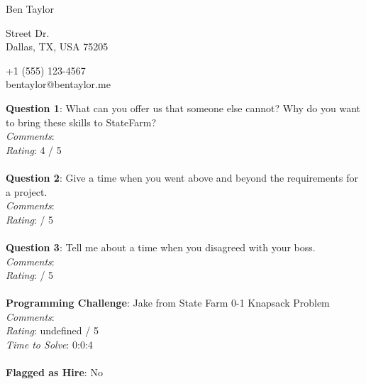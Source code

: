 \documentclass[12pt]{article}
\begin{document}
{\LARGE \begin{center}Ben Taylor\end{center}}

\begin{multicols}{2}
 Street Dr. \\
Dallas, TX, USA 75205
\columnbreak

\noindent
+1 (555) 123-4567 \\
bentaylor@bentaylor.me
\end{multicols}

\noindent
\textbf{Question 1}: What can you offer us that someone else cannot? Why do you want to bring these skills to StateFarm?
\\\noindent
\textit{Comments}: 
\\\noindent
\textit{Rating}: 4 / 5
\\\\
\noindent
\textbf{Question 2}: Give a time when you went above and beyond the requirements for a project.
\\\noindent
\textit{Comments}: 
\\\noindent
\textit{Rating}:  / 5
\\\\
\noindent
\textbf{Question 3}: Tell me about a time when you disagreed with your boss.
\\\noindent
\textit{Comments}: 
\\\noindent
\textit{Rating}:  / 5
\\\\
\noindent
\textbf{Programming Challenge}: Jake from State Farm 0-1 Knapsack Problem
\\\noindent
\textit{Comments}: 
\\\noindent
\textit{Rating}: undefined / 5
\\\noindent
\textit{Time to Solve}: 0:0:4
\\\\
\textbf{Flagged as Hire}: No
\\\\ 
\end{document}

